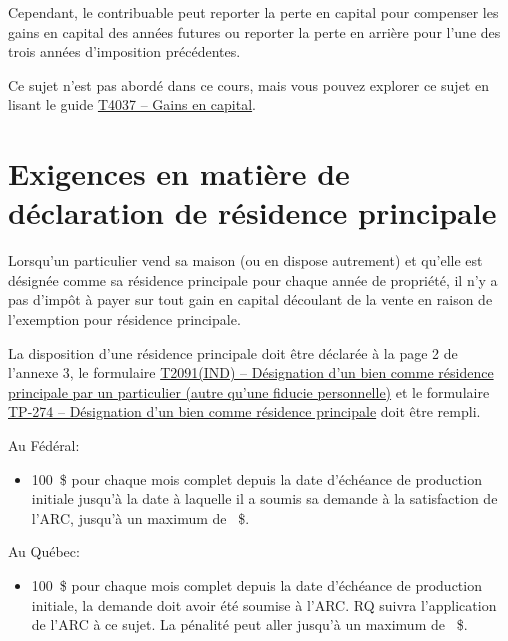 Cependant, le contribuable peut reporter la perte en capital pour compenser les gains en capital des années futures ou reporter la perte en arrière pour l'une des trois années d'imposition précédentes.

Ce sujet n'est pas abordé dans ce cours, mais vous pouvez explorer ce sujet en lisant le guide \cat\href{https://www.canada.ca/content/dam/cra-arc/formspubs/pub/t4037/t4037-22f.pdf}{T4037 -- Gains en capital}.



\section{Exigences en matière de déclaration de résidence principale}
\begin{intro}
	Lorsqu'un particulier vend sa maison (ou en dispose autrement) et qu'elle est désignée comme sa résidence principale pour chaque année de propriété, il n'y a pas d'impôt à payer sur tout gain en capital découlant de la vente en raison de l'exemption pour résidence principale.
\end{intro}

La disposition d'une résidence principale doit être déclarée à la page 2 de l'annexe 3, le formulaire \href{https://www.canada.ca/fr/agence-revenu/services/formulaires-publications/formulaires/t2091ind.html}{T2091(IND) – Désignation d'un bien comme résidence principale par un particulier (autre qu'une fiducie personnelle)} et le formulaire \href{https://www.revenuquebec.ca/fr/services-en-ligne/formulaires-et-publications/details-courant/tp-274/}{TP-274 – Désignation d'un bien comme résidence principale} doit être rempli.

Au Fédéral:
\begin{itemize}
	\item 100~\$ pour chaque mois complet depuis la date d'échéance de production initiale jusqu'à la date à laquelle il a soumis sa demande à la satisfaction de l'ARC, jusqu'à un maximum de ~\$.
\end{itemize}

Au Québec:
\begin{itemize}
	\item 100~\$ pour chaque mois complet depuis la date d'échéance de production initiale, la demande doit avoir été soumise à l'ARC. RQ suivra l'application de l'ARC à ce sujet. La pénalité peut aller jusqu'à un maximum de ~\$.
\end{itemize}

